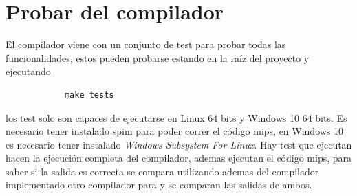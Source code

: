 \documentclass[12pt,a4paper]{article}
\begin{document}
	\section{Probar del compilador}
		El compilador viene con un conjunto de test para probar todas las funcionalidades, estos pueden probarse estando en la raíz del proyecto y ejecutando 
		\begin{lstlisting}
			make tests
		\end{lstlisting}
		los test solo son capaces de ejecutarse en Linux 64 bits y Windows 10 64 bits. Es necesario tener instalado spim para poder correr el código mips, en Windows 10 es necesario tener instalado \textit{Windows Subsystem For Linux}. Hay test que ejecutan hacen la ejecución completa del compilador, ademas ejecutan el código mips, para saber si la salida es correcta se compara utilizando ademas del compilador implementado otro compilador para y se comparan las salidas de ambos.
\end{document}
